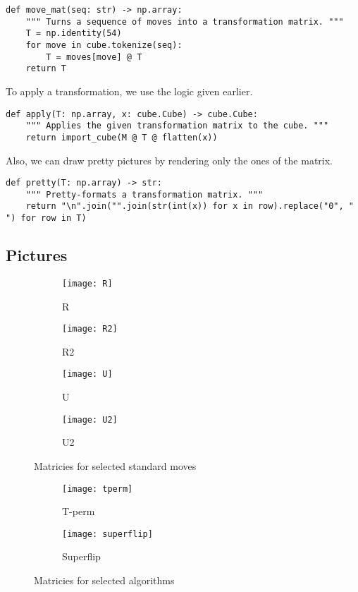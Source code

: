 \documentclass[11pt, oneside]{article}
\begin{document}
\begin{verbatim}
def move_mat(seq: str) -> np.array:
    """ Turns a sequence of moves into a transformation matrix. """
    T = np.identity(54)
    for move in cube.tokenize(seq):
        T = moves[move] @ T
    return T
\end{verbatim}

To apply a transformation, we use the logic given earlier.

\begin{verbatim}
def apply(T: np.array, x: cube.Cube) -> cube.Cube:
    """ Applies the given transformation matrix to the cube. """
    return import_cube(M @ T @ flatten(x))
\end{verbatim}

Also, we can draw pretty pictures by rendering only the ones of the matrix.
\begin{verbatim}
def pretty(T: np.array) -> str:
    """ Pretty-formats a transformation matrix. """
    return "\n".join("".join(str(int(x)) for x in row).replace("0", " ") for row in T)
\end{verbatim}

\newpage

\subsection{Pictures}

\begin{figure}[h!]
    \centering
    \begin{subfigure}[h]{0.4 \textwidth}
        \texttt{[image: R]}
        \caption{R}
    \end{subfigure}
    \hfill
    \begin{subfigure}[h]{0.4 \textwidth}
        \texttt{[image: R2]}
        \caption{R2}
    \end{subfigure}
    \begin{subfigure}[h]{0.4 \textwidth}
        \texttt{[image: U]}
        \caption{U}
    \end{subfigure}
    \hfill
    \begin{subfigure}[h]{0.4 \textwidth}
        \texttt{[image: U2]}
        \caption{U2}
    \end{subfigure}
    \caption{Matricies for selected standard moves}
\end{figure}

\newpage

\begin{figure}[h!]
  \centering
  \begin{subfigure}[h]{0.4 \textwidth}
      \texttt{[image: tperm]}
      \caption{T-perm}
  \end{subfigure}
  \hfill
  \begin{subfigure}[h]{0.4 \textwidth}
      \texttt{[image: superflip]}
      \caption{Superflip}
  \end{subfigure}
  \caption{Matricies for selected algorithms}
\end{figure}
\end{document}
